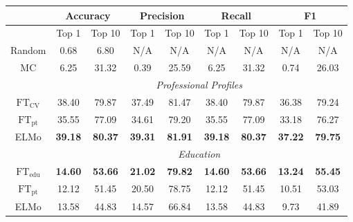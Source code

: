\begin{table}
\centering \small
\begin{tabular}{@{}ccccccccc@{}} 
\toprule
\multicolumn{1}{c}{}      & \multicolumn{2}{c}{Accuracy}      & \multicolumn{2}{c}{Precision}     & \multicolumn{2}{c}{Recall}        & \multicolumn{2}{c}{F1}            \\ \midrule
                          & Top 1           & Top 10          & Top 1           & Top 10          & Top 1           & Top 10          & Top 1           & Top 10           \\ 
\midrule
Random                    & 0.68            & 6.80            & N/A             & N/A             & N/A             & N/A             & N/A             & N/A              \\
MC                        & 6.25            & 31.32           & 0.39            & 25.59           & 6.25            & 31.32           & 0.74            & 26.03            \\ 
\midrule
                          & \multicolumn{8}{c}{\textit{Professional Profiles} }                                                                                            \\
$\text{FT}_{\text{CV}}$   & 38.40           & 79.87           & 37.49           & 81.47           & 38.40           & 79.87           & 36.38           & 79.24            \\
$\text{FT}_{\text{pt}}$   & 35.55           & 77.09           & 34.61           & 79.20           & 35.55           & 77.09           & 33.18           & 76.27            \\
ELMo                      & \textbf{39.18}  & \textbf{80.37}  & \textbf{39.31}  & \textbf{81.91}  & \textbf{39.18}  & \textbf{80.37}  & \textbf{37.22}  & \textbf{79.75}   \\ 
\midrule
                          & \multicolumn{8}{c}{\textit{Education} }                                                                                                        \\
$\text{FT}_{\text{edu}}$  & \textbf{14.60}  & \textbf{53.66}  & \textbf{21.02}  & \textbf{79.82}  & \textbf{14.60}  & \textbf{53.66}  & \textbf{13.24}  & \textbf{55.45}   \\
$\text{FT}_{\text{pt}}$   & 12.12           & 51.45           & 20.50           & 78.75           & 12.12           & 51.45           & 10.51           & 53.03            \\
ELMo                      & 13.58           & 44.83           & 14.57           & 66.84           & 13.58           & 44.83           & 9.73            & 41.89            \\
\bottomrule
\end{tabular}

\label{tab:ind}

\end{table}